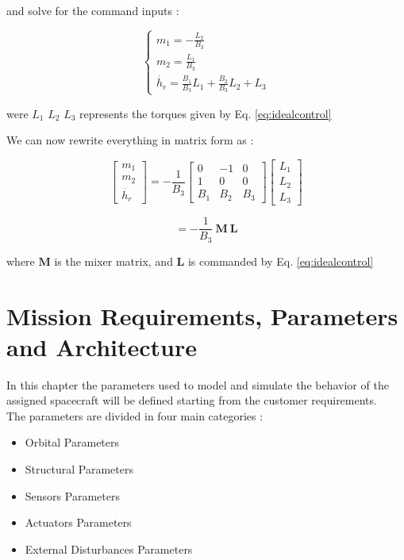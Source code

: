 \documentclass[11pt,a4paper]{report}
\begin{document}
and solve for the command inputs : 

\begin{equation}
 \begin{cases} m_{1}=-\frac{L_2}{B_3}\\ m_2 = \frac{L_1}{B_3} \\ \dot{h_{r}} = \frac{B_1}{B_3}L_1 + \frac{B_2}{B_3} L_2 + L_3 \end{cases}
\end{equation}

were $L_1$ $L_2$ $L_3$ represents the torques given by Eq. \ref{eq:idealcontrol}

We can now rewrite everything in matrix form as : 

\begin{equation}
 \begin{bmatrix}
    m_1\\
    m_2\\
    \dot{h_{r}}
 \end{bmatrix}
= - \frac{1}{B_3}
 \begin{bmatrix}
    0 & -1 & 0 \\
    1 & 0 & 0 \\
    B_{1} & B_{2} & B_{3}
 \end{bmatrix} 
 \begin{bmatrix}
    L_{1}\\
    L_{2}\\
    L_{3}
 \end{bmatrix}  
\end{equation}

\begin{equation}
 [\mathbf{m_{1:2}} \ \mathbf{\dot{h}_{r}}] = -\frac{1}{B_3} \ \mathbf{M} \ \mathbf{L}
\end{equation}

where $\mathbf{M}$ is the mixer matrix, and $\mathbf{L}$ is commanded by Eq. \ref{eq:idealcontrol}

\chapter{Mission Requirements, Parameters and Architecture }
In this chapter the parameters used to model and simulate the behavior of the assigned spacecraft will be defined starting from the customer requirements.\\
The parameters are divided in four main categories : 

\begin{itemize}
 \item Orbital Parameters
 \item Structural Parameters
 \item Sensors Parameters
 \item Actuators Parameters
 \item External Disturbances Parameters
\end{itemize}
\end{document}
